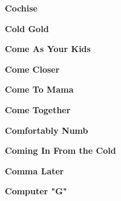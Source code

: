 \begin{center}\textbf{Cochise}\end{center}
\newline
\vspace{10pt} 
\begin{center}\textbf{Cold Gold}\end{center}
\newline
\vspace{10pt} 
\begin{center}\textbf{Come As Your Kids}\end{center}
\newline
\vspace{10pt} 
\begin{center}\textbf{Come Closer}\end{center}
\newline
\vspace{10pt} 
\begin{center}\textbf{Come To Mama}\end{center}
\newline
\vspace{10pt} 
\begin{center}\textbf{Come Together}\end{center}
\newline
\vspace{10pt} 
\begin{center}\textbf{Comfortably Numb}\end{center}
\newline
\vspace{10pt} 
\begin{center}\textbf{Coming In From the Cold}\end{center}
\newline
\vspace{10pt} 
\begin{center}\textbf{Comma Later}\end{center}
\newline
\vspace{10pt} 
\begin{center}\textbf{Computer "G"}\end{center}
\newline
